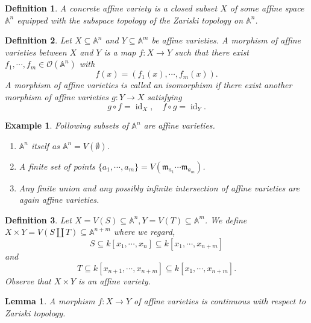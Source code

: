 \documentclass[10pt]{article}
\newtheorem{definition}{Definition}[section]
\newtheorem{lemma}{Lemma}[section]
\newtheorem{example}{Example}[section]
\numberwithin{equation}{theorem}
\DeclareMathOperator{\id}{id}
\newcommand{\m}[0]{\mathfrak{m}}
\newcommand{\A}[0]{\mathbb{A}}
\begin{document}
\begin{definition}
A concrete affine variety is a closed subset $X$ of some affine space $\A^n$ equipped with the subspace topology of the Zariski topology on $\A^n$.
\end{definition}

\begin{definition}
Let $X\subseteq\A^n$ and $Y\subseteq\A^m$ be affine varieties. A morphism of affine varieties between $X$ and $Y$ is a map $f:X\to Y$ such that there exist $f_1,\cdots,f_m\in\mathcal{O}(\A^n)$ with 
\begin{equation*}
f(x) = (f_1(x),\cdots,f_m(x)).
\end{equation*}
A morphism of affine varieties is called an isomorphism if there exist another morphism of affine varieties $g:Y\to X$ satisfying
\begin{equation*}
g\circ f=\id_X,\quad f\circ g=\id_Y.
\end{equation*}
\end{definition}

\begin{example}Following subsets of $\A^n$ are affine varieties.
\begin{enumerate}[1).]
\item $\A^n$ itself as $\A^n=V(\emptyset)$.
\item A finite set of points $\{a_1,\cdots,a_m\}=V(\m_{a_1}\cdots\m_{a_m})$.
\item Any finite union and any possibly infinite intersection of affine varieties are again affine varieties.
\end{enumerate}
\end{example}

\begin{definition}
\item Let $X=V(S)\subseteq\A^n,Y=V(T)\subseteq\A^m$. We define $X\times Y = V(S\coprod T)\subseteq\A^{n+m}$ where we regard,
\begin{equation*}
S\subseteq k[x_1,\cdots,x_n]\subseteq k[x_1,\cdots,x_{n+m}]
\end{equation*}
and 
\begin{equation*}
T\subseteq k[x_{n+1},\cdots,x_{n+m}]\subseteq k[x_1,\cdots,x_{n+m}].
\end{equation*}
Observe that $X\times Y$ is an affine variety.
\end{definition}
\begin{lemma}
A morphism $f:X\to Y$ of affine varieties is continuous with respect to Zariski topology.
\end{lemma}
\end{document}
